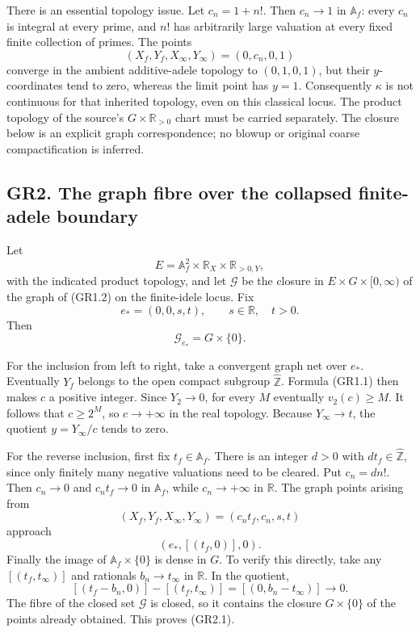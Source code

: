 There is an essential topology issue. Let \(c_n=1+n!\). Then \(c_n\to1\)
in \(\mathbb A_f\): every \(c_n\) is integral at every prime, and \(n!\)
has arbitrarily large valuation at every fixed finite collection of
primes. The points \[
(X_f,Y_f,X_\infty,Y_\infty)=(0,c_n,0,1)
\] converge in the ambient additive-adele topology to \((0,1,0,1)\), but
their \(y\)-coordinates tend to zero, whereas the limit point has
\(y=1\). Consequently \(\kappa\) is not continuous for that inherited
topology, even on this classical locus. The product topology of the
source's \(G\times\mathbb R_{>0}\) chart must be carried separately. The
closure below is an explicit graph correspondence; no blowup or original
coarse compactification is inferred.

\subsection{GR2. The graph fibre over the collapsed finite-adele
boundary}\label{gr2.-the-graph-fibre-over-the-collapsed-finite-adele-boundary}

Let \[
E=\mathbb A_f^2\times\mathbb R_X\times\mathbb R_{>0,Y},
\] with the indicated product topology, and let \(\mathscr G\) be the
closure in \(E\times G\times[0,\infty)\) of the graph of (GR1.2) on the
finite-idele locus. Fix \[
e_*=(0,0,s,t),\qquad s\in\mathbb R,\quad t>0.
\] Then \[
\mathscr G_{e_*}=G\times\{0\}.
\tag{GR2.1}
\]

For the inclusion from left to right, take a convergent graph net over
\(e_*\). Eventually \(Y_f\) belongs to the open compact subgroup
\(\widehat{\mathbb Z}\). Formula (GR1.1) then makes \(c\) a positive
integer. Since \(Y_2\to0\), for every \(M\) eventually \(v_2(c)\ge M\).
It follows that \(c\ge2^M\), so \(c\to+\infty\) in the real topology.
Because \(Y_\infty\to t\), the quotient \(y=Y_\infty/c\) tends to zero.

For the reverse inclusion, first fix \(t_f\in\mathbb A_f\). There is an
integer \(d>0\) with \(dt_f\in\widehat{\mathbb Z}\), since only finitely
many negative valuations need to be cleared. Put \(c_n=d n!\). Then
\(c_n\to0\) and \(c_nt_f\to0\) in \(\mathbb A_f\), while
\(c_n\to+\infty\) in \(\mathbb R\). The graph points arising from \[
(X_f,Y_f,X_\infty,Y_\infty)=(c_nt_f,c_n,s,t)
\] approach \[
(e_*,[(t_f,0)],0).
\] Finally the image of \(\mathbb A_f\times\{0\}\) is dense in \(G\). To
verify this directly, take any \([(t_f,t_\infty)]\) and rationals
\(b_n\to t_\infty\) in \(\mathbb R\). In the quotient, \[
[(t_f-b_n,0)]-[(t_f,t_\infty)]
=[(0,b_n-t_\infty)]\longrightarrow0.
\] The fibre of the closed set \(\mathscr G\) is closed, so it contains
the closure \(G\times\{0\}\) of the points already obtained. This proves
(GR2.1).

